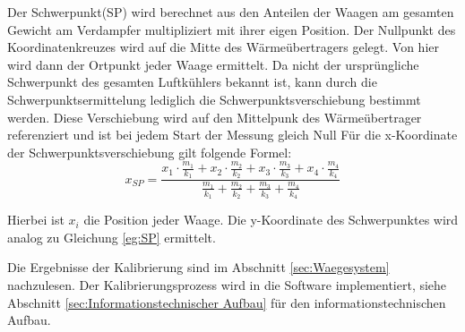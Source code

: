 Der Schwerpunkt(SP) wird berechnet aus den Anteilen der Waagen am gesamten Gewicht am Verdampfer multipliziert mit ihrer eigen Position. Der Nullpunkt des Koordinatenkreuzes wird auf die Mitte des Wärmeübertragers gelegt. Von hier wird dann der Ortpunkt jeder Waage ermittelt. Da nicht der ursprüngliche Schwerpunkt des gesamten Luftkühlers bekannt ist, kann durch die Schwerpunktsermittelung lediglich die Schwerpunktsverschiebung bestimmt werden. Diese Verschiebung wird auf den Mittelpunk des Wärmeübertrager referenziert und ist bei jedem Start der Messung gleich Null
Für die x-Koordinate der Schwerpunktsverschiebung gilt folgende Formel:
\begin{equation}
x_{SP} = \frac{x_1\cdot \frac{m_1}{k_1}+ x_2\cdot \frac{m_2}{k_2}+ x_3\cdot \frac{m_3}{k_3}+x_4\cdot \frac{m_4}{k_4}}{\frac{m_1}{k_1}+ \frac{m_2}{k_2}+ \frac{m_3}{k_3}+\frac{m_4}{k_4}}
\label{eq:SP}
\end{equation}

Hierbei ist $x_i$ die Position jeder Waage. Die y-Koordinate des Schwerpunktes wird analog zu Gleichung \ref{eg:SP} ermittelt. 

Die Ergebnisse der Kalibrierung sind im Abschnitt \ref{sec:Waegesystem} nachzulesen.  
Der Kalibrierungsprozess wird in die Software implementiert, siehe Abschnitt \ref{sec:Informationstechnischer Aufbau} für den informationstechnischen Aufbau. 







